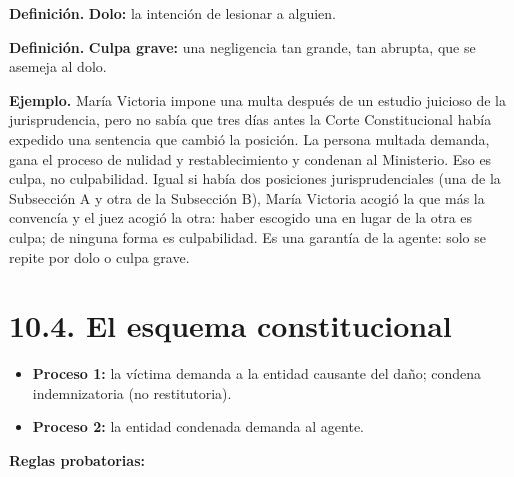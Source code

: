 \begin{definicion}
\textcolor[HTML]{1F3864}{\textbf{Definición. }}\textbf{Dolo: }la intención de lesionar a alguien.
\par
\textcolor[HTML]{1F3864}{\textbf{Definición. }}\textbf{Culpa grave: }una negligencia tan grande, tan abrupta, que se asemeja al dolo.
\end{definicion}
\begin{ejemplo}
\textcolor[HTML]{4F6228}{\textbf{Ejemplo. }}María Victoria impone una multa después de un estudio juicioso de la jurisprudencia, pero no sabía que tres días antes la Corte Constitucional había expedido una sentencia que cambió la posición. La persona multada demanda, gana el proceso de nulidad y restablecimiento y condenan al Ministerio. Eso es culpa, no culpabilidad. Igual si había dos posiciones jurisprudenciales (una de la Subsección A y otra de la Subsección B), María Victoria acogió la que más la convencía y el juez acogió la otra: haber escogido una en lugar de la otra es culpa; de ninguna forma es culpabilidad. Es una garantía de la agente: solo se repite por dolo o culpa grave.
\end{ejemplo}
\section{10.4. El esquema constitucional}
\begin{itemize}
\item \textbf{Proceso 1:} la víctima demanda a la entidad causante del daño; condena indemnizatoria (no restitutoria).
\item \textbf{Proceso 2:} la entidad condenada demanda al agente.
\end{itemize}
\textbf{Reglas probatorias:}

